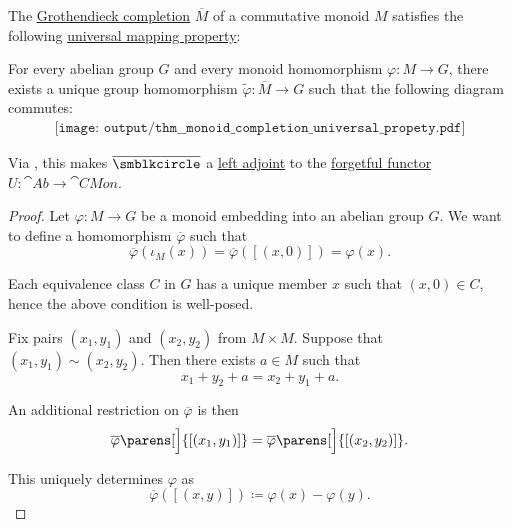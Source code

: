 \begin{proposition}\label{thm:monoid_completion_universal_propety}
  The \hyperref[def:monoid_completion]{Grothendieck completion} \( \overline{M} \) of a commutative monoid \( M \) satisfies the following \hyperref[rem:universal_mapping_property]{universal mapping property}:
  \begin{displayquote}
    For every abelian group \( G \) and every monoid homomorphism \( \varphi: M \to G \), there exists a unique group homomorphism \( \widetilde{\varphi}: \overline{M} \to G \) such that the following diagram commutes:
    \begin{equation}\label{eq:thm:monoid_completion_universal_propety/diagram}
      \begin{aligned}
        \texttt{[image: output/thm\_\_monoid\_completion\_universal\_propety.pdf]}
      \end{aligned}
    \end{equation}
  \end{displayquote}

  Via , this makes \( \overline{\anon} \) a \hyperref[def:category_adjunction]{left adjoint} to the \hyperref[def:concrete_category]{forgetful functor} \( U: \cat{Ab} \to \cat{CMon} \).
\end{proposition}
\begin{proof}
  Let \( \varphi: M \to G \) be a monoid embedding into an abelian group \( G \). We want to define a homomorphism \( \overline{\varphi} \) such that
  \begin{equation*}
    \overline{\varphi}(\iota_M(x)) = \overline{\varphi}([(x, 0)]) = \varphi(x).
  \end{equation*}

  Each equivalence class \( C \) in \( G \) has a unique member \( x \) such that \( (x, 0) \in C \), hence the above condition is well-posed.

  Fix pairs \( (x_1, y_1) \) and \( (x_2, y_2) \) from \( M \times M \). Suppose that \( (x_1, y_1) \sim (x_2, y_2) \). Then there exists \( a \in M \) such that
  \begin{equation*}
    x_1 + y_2 + a = x_2 + y_1 + a.
  \end{equation*}

  An additional restriction on \( \overline{\varphi} \) is then
  \begin{equation*}
    \overline{\varphi}\parens[\Big]{ [(x_1, y_1)] }
    =
    \overline{\varphi}\parens[\Big]{ [(x_2, y_2)] }.
  \end{equation*}

  This uniquely determines \( \varphi \) as
  \begin{equation*}
    \overline{\varphi}([(x, y)]) \coloneqq \varphi(x) - \varphi(y).
  \end{equation*}
\end{proof}

